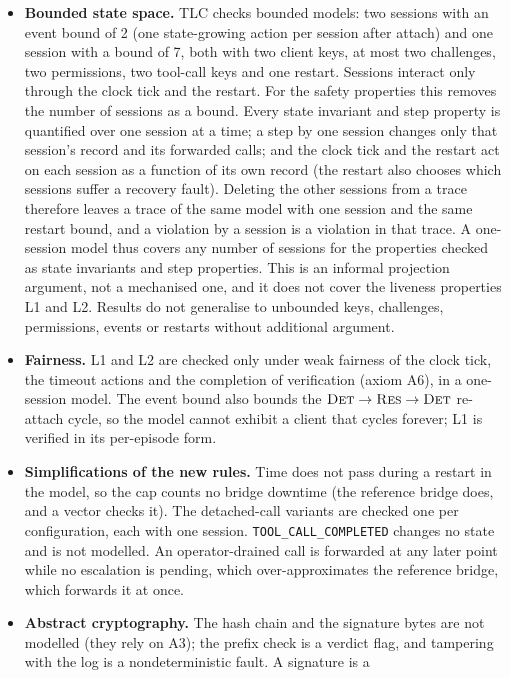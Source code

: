 \begin{itemize}[leftmargin=2em]
\item \textbf{Bounded state space.} TLC checks bounded models: two
sessions with an event bound of 2 (one state-growing action per session
after attach) and one session with a bound of 7, both with two client
keys, at most two challenges, two permissions, two tool-call keys and one
restart. Sessions
interact only through the clock tick and the restart. For the safety
properties this removes the number of sessions as a bound. Every state
invariant and step property is quantified over one session at a time; a
step by one session changes only that session's record and its forwarded
calls; and the clock tick and the restart act on each session as a
function of its own record (the restart also chooses which sessions
suffer a recovery fault). Deleting the other sessions from a trace
therefore leaves a trace of the same model with one session and the same
restart bound, and a violation by a session is a violation in that
trace. A one-session model thus covers any number of sessions for the
properties checked as state invariants and step properties. This is an
informal projection argument, not a mechanised one, and it does not
cover the liveness properties L1 and L2. Results do not generalise to
unbounded keys, challenges, permissions, events or restarts without
additional argument.
\item \textbf{Fairness.} L1 and L2 are checked only under weak
fairness of the clock tick, the timeout actions and the completion of
verification (axiom A6), in a one-session model. The event bound also
bounds the $\textsc{Det}\to\textsc{Res}\to\textsc{Det}$ re-attach cycle, so
the model cannot exhibit a client that cycles forever; L1 is verified in
its per-episode form.
\item \textbf{Simplifications of the new rules.} Time does not pass
during a restart in the model, so the cap counts no bridge downtime
(the reference bridge does, and a vector checks it). The detached-call
variants are checked one per configuration, each with one session.
\texttt{TOOL\_CALL\_COMPLETED} changes no state and is not modelled. An
operator-drained call is forwarded at any later point while no escalation
is pending, which over-approximates the reference bridge, which forwards it
at once.
\item \textbf{Abstract cryptography.} The hash chain and the signature
bytes are not modelled (they rely on A3); the prefix check is a verdict flag,
and tampering with the log is a nondeterministic fault. A signature is a

\end{itemize}
